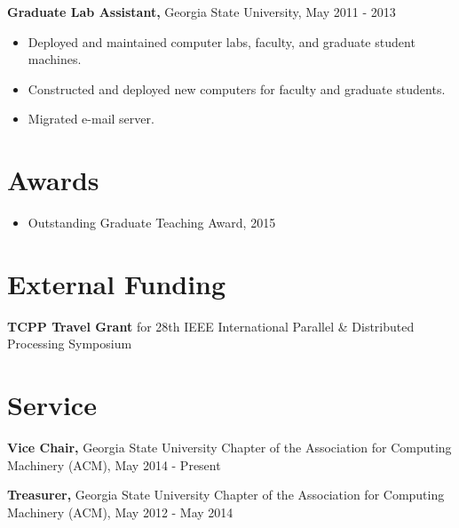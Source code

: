 \documentclass{res}
\begin{document}
\begin{resume}
\begin{itemize}
     \end{itemize}   
     
{\bf Graduate Lab Assistant,} Georgia State University, May 2011 - 2013
     \begin{itemize}
     \item Deployed and maintained computer labs, faculty, and graduate student machines.
     \item Constructed and deployed new computers for faculty and graduate students.
     \item Migrated e-mail server.
     \end{itemize}
     


\section{Awards}
\begin{itemize}    
	\item Outstanding Graduate Teaching Award, 2015
\end{itemize}   

\section{External Funding}
\textbf{TCPP Travel Grant} for 28th IEEE International Parallel \& Distributed Processing Symposium


\section{Service}


{\bf Vice Chair,} Georgia State University Chapter of the Association for Computing Machinery (ACM),  May 2014 - Present

{\bf Treasurer,} Georgia State University Chapter of the Association for Computing Machinery (ACM), May 2012 - May 2014


\end{resume}
\end{document}
